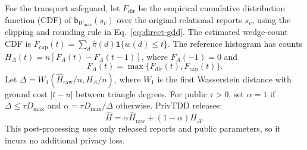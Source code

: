 For the transport safeguard, let $F_{\mathrm{dir}}$ be the empirical cumulative distribution function (CDF) of $\mathsf b_{W_{\max}}(s_v)$ over the original relational reports $s_v$, using the clipping and rounding rule in Eq.~\eqref{eq:direct-gdd}. The estimated wedge-count CDF is $F_{\mathrm{cap}}(t)=\sum_d\widehat\pi(d)\mathbf1\{w(d)\le t\}$. The reference histogram has counts $H_A(t)=n[F_A(t)-F_A(t-1)]$, where $F_A(-1)=0$ and
\begin{equation}
F_A(t)=\max\{F_{\mathrm{dir}}(t),F_{\mathrm{cap}}(t)\}.
\label{eq:pg-reference-cdf}
\end{equation}
Let $\Delta=W_1(\widehat H_{\mathrm{raw}}/n,H_A/n)$, where $W_1$ is the first Wasserstein distance with ground cost $|t-u|$ between triangle degrees. For public $\tau>0$, set $\alpha=1$ if $\Delta\le\tau D_{\max}$ and $\alpha=\tau D_{\max}/\Delta$ otherwise. PrivTDD releases:
\begin{equation}
\widehat H=\alpha\widehat H_{\mathrm{raw}}+(1-\alpha)H_A.
\label{eq:pg-guard}
\end{equation}
This post-processing uses only released reports and public parameters, so it incurs no additional privacy loss.
